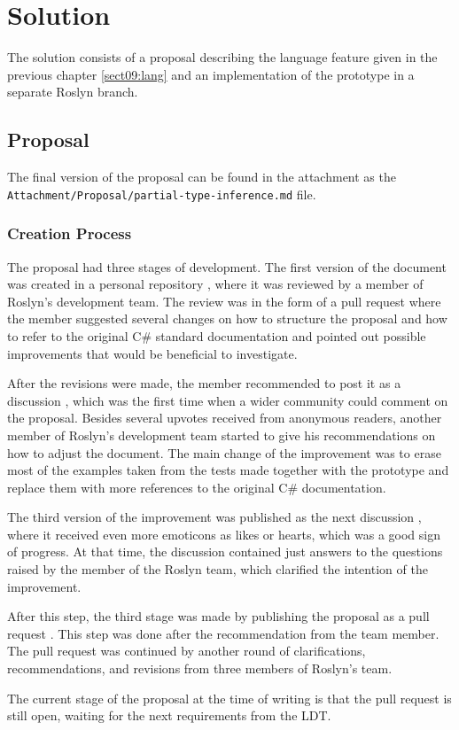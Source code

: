 \chapter{Solution}

The solution consists of a proposal describing the language feature given in the previous chapter \ref{sect09:lang} and an implementation of the prototype in a separate Roslyn branch.

\section{Proposal}

The final version of the proposal can be found in the attachment as the\\ \texttt{Attachment/Proposal/partial-type-inference.md} file.

\subsection{Creation Process}

The proposal had three stages of development. 
The first version of the document was created in a personal repository \cite{online:personalRepo}, where it was reviewed by a member of Roslyn's development team. 
The review was in the form of a pull request \cite{online:personalPull} where the member suggested several changes on how to structure the proposal and how to refer to the original C\# standard documentation and pointed out possible improvements that would be beneficial to investigate.
\par
After the revisions were made, the member recommended to post it as a discussion \cite{online:discussion1}, which was the first time when a wider community could comment on the proposal. 
Besides several upvotes received from anonymous readers, another member of Roslyn's development team started to give his recommendations on how to adjust the document. 
The main change of the improvement was to erase most of the examples taken from the tests made together with the prototype and replace them with more references to the original C\# documentation.
\par
The third version of the improvement was published as the next discussion \cite{online:discussion2}, where it received even more emoticons as likes or hearts, which was a good sign of progress. 
At that time, the discussion contained just answers to the questions raised by the member of the Roslyn team, which clarified the intention of the improvement.
\par
After this step, the third stage was made by publishing the proposal as a pull request \cite{online:pull2}. 
This step was done after the recommendation from the team member. 
The pull request was continued by another round of clarifications, recommendations, and revisions from three members of Roslyn's team.
\par
The current stage of the proposal at the time of writing is that the pull
request is still open, waiting for the next requirements from the LDT.

